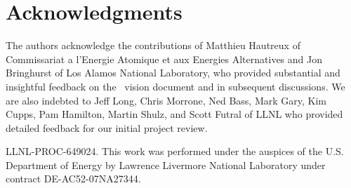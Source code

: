 \section {Acknowledgments}
The authors acknowledge the contributions of Matthieu Hautreux
of Commissariat a l'Energie Atomique et aux Energies Alternatives
and Jon Bringhurst of Los Alamos National Laboratory, who provided
substantial and insightful feedback on the \flux\ vision document
and in subsequent discussions.
We are also indebted to 
Jeff Long, Chris Morrone, Ned Bass,
Mark Gary, Kim Cupps, Pam Hamilton, Martin Shulz, and Scott Futral
of LLNL who provided detailed feedback for our initial project review.

LLNL-PROC-649024.
This work was performed under the auspices of the U.S. Department
of Energy by Lawrence Livermore National Laboratory under
contract DE-AC52-07NA27344.
